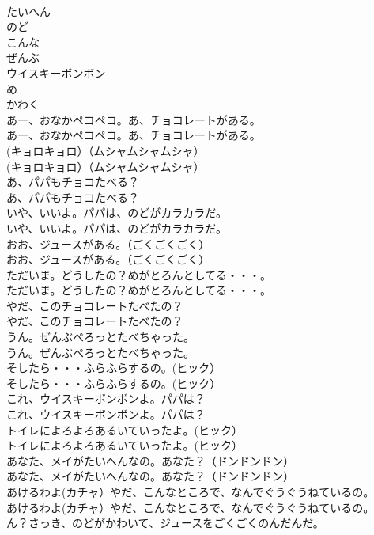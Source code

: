 \documentclass[8pt]{extreport}
\begin{document}
\begin{CJK}{UTF8}{min}
\\	たいへん
\\	のど
\\	こんな
\\	ぜんぶ
\\	ウイスキーボンボン
\\	め
\\	かわく
\\	あー、おなかペコペコ。あ、チョコレートがある。
\\	あー、おなかペコペコ。あ、チョコレートがある。
\\	(キョロキョロ）（ムシャムシャムシャ）
\\	(キョロキョロ）（ムシャムシャムシャ）
\\	あ、パパもチョコたべる？
\\	あ、パパもチョコたべる？
\\	いや、いいよ。パパは、のどがカラカラだ。
\\	いや、いいよ。パパは、のどがカラカラだ。
\\	おお、ジュースがある。（ごくごくごく）
\\	おお、ジュースがある。（ごくごくごく）
\\	ただいま。どうしたの？めがとろんとしてる・・・。
\\	ただいま。どうしたの？めがとろんとしてる・・・。
\\	やだ、このチョコレートたべたの？
\\	やだ、このチョコレートたべたの？
\\	うん。ぜんぶぺろっとたべちゃった。
\\	うん。ぜんぶぺろっとたべちゃった。
\\	そしたら・・・ふらふらするの。(ヒック）
\\	そしたら・・・ふらふらするの。(ヒック）
\\	これ、ウイスキーボンボンよ。パパは？
\\	これ、ウイスキーボンボンよ。パパは？
\\	トイレによろよろあるいていったよ。(ヒック）
\\	トイレによろよろあるいていったよ。(ヒック）
\\	あなた、メイがたいへんなの。あなた？（ドンドンドン）
\\	あなた、メイがたいへんなの。あなた？（ドンドンドン）
\\	あけるわよ(カチャ）やだ、こんなところで、なんでぐうぐうねているの。
\\	あけるわよ(カチャ）やだ、こんなところで、なんでぐうぐうねているの。
\\	ん？さっき、のどがかわいて、ジュースをごくごくのんだんだ。

\end{CJK}
\end{document}
